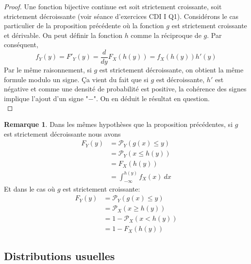 \documentclass[a4paper,12pt]{report}
\theoremstyle{definition}
\renewcommand{\(}{\left(}
\renewcommand{\)}{\right)}
\renewcommand{\P}{\mathcal{P}}
\newtheorem{rmk}[thm]{Remarque}
\begin{document}
            \begin{proof}
                Une fonction bijective continue est soit strictement croissante, soit strictement décroissante (voir séance d'exercices CDI I Q1). Considérons le cas particulier de la proposition précédente où la fonction $g$ est strictement croissante et dérivable. On peut définir la fonction $h$ comme la réciproque de $g$. Par conséquent,
                $$f_Y(y) = F'_Y(y) = \frac{d}{dy}F_X(h(y)) = f_X(h(y))h'(y)$$
                Par le même raisonnement, si $g$ est strictement décroissante, on obtient la même formule modulo un signe. Ça vient du fait que si $g$ est décroissante, $h'$ est négative et comme une densité de probabilité est positive, la cohérence des signes implique l'ajout d'un signe "$-$". On en déduit le résultat en question.\\
            \end{proof}
            
            \begin{rmk}
                Dans les mêmes hypothèses que la proposition précédentes, si $g$ est strictement décroissante nous avons
                \begin{align*}
                    F_Y(y) &= \P_Y(g(x)\leq y) \\
                    &= \P_Y(x\leq h(y)) \\
                    &= F_X(h(y)) \\
                    &= \int_{-\infty}^{h(y)}f_X(x)~dx
                \end{align*}
                Et dans le cas où $g$ est strictement croissante:
                \begin{align*}
                    F_Y(y) &= \P_Y(g(x)\leq y) \\
                    &= \P_X(x\geq h(y)) \\
                    &= 1-\P_X(x< h(y)) \\
                    &= 1-F_X(h(y))
                \end{align*}
            \end{rmk}
            
            
            
        \subsection{Distributions usuelles}
        
\end{document}
